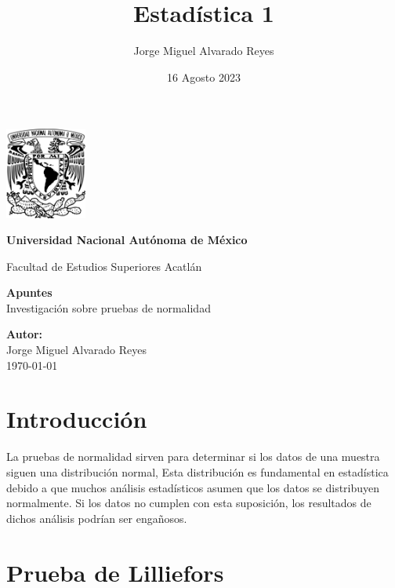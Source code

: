 \documentclass{article}
\title{Estadística 1}
\author{Jorge Miguel Alvarado Reyes}
\date{16 Agosto 2023}
\begin{document}
\begin{titlepage}
    \begin{center}
        \includegraphics[width=0.2\textwidth]{../../unam.png}
        \vspace*{.5cm}

        \LARGE
        \textbf{Universidad Nacional Autónoma de México}

        \vspace{0.5cm}
        \LARGE
        Facultad de Estudios Superiores Acatlán

        \vspace{2cm}

        \textbf{Apuntes} \\
        Investigación sobre pruebas de normalidad

        \vfill

        \vspace{1cm}

        \textbf{\large Autor:} \\
        Jorge Miguel Alvarado Reyes \\
        \vspace{.5cm}
        \normalsize \today

    \end{center}
\end{titlepage}
\newpage

\tableofcontents

\newpage

\section{Introducción}

La pruebas de normalidad sirven para determinar si los datos de una muestra siguen una distribución normal, Esta distribución es fundamental en estadística debido a que muchos análisis estadísticos asumen que los datos se distribuyen normalmente. Si los datos no cumplen con esta suposición, los resultados de dichos análisis podrían ser engañosos.

\section{Prueba de Lilliefors}
\end{document}
